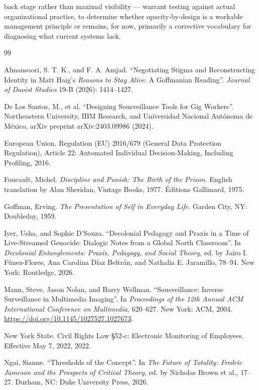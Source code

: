 \documentclass[12pt]{article}
\begin{document}
back stage rather than maximal visibility --- warrant testing against actual organizational practice, to determine whether opacity-by-design is a workable management principle or remains, for now, primarily a corrective vocabulary for diagnosing what current systems lack.

\newpage
\begin{thebibliography}{99}
\setlength{\itemsep}{0.6em}

 Almansoori, S. T. K., and F. A. Amjad. ``Negotiating Stigma and Reconstructing Identity in Matt Haig's \emph{Reasons to Stay Alive}: A Goffmanian Reading''. \emph{Journal of Daoist Studies} 19-B (2026): 1414--1427.

 De Los Santos, M., et al. ``Designing Sousveillance Tools for Gig Workers''. Northeastern University, IBM Research, and Universidad Nacional Aut\'onoma de M\'exico, arXiv preprint arXiv:2403.09986 (2024).

 European Union. Regulation (EU) 2016/679 (General Data Protection Regulation), Article 22: Automated Individual Decision-Making, Including Profiling, 2016.

 Foucault, Michel. \emph{Discipline and Punish: The Birth of the Prison}. English translation by Alan Sheridan, Vintage Books, 1977. \'Editions Gallimard, 1975.

 Goffman, Erving. \emph{The Presentation of Self in Everyday Life}. Garden City, NY: Doubleday, 1959.

 Iyer, Usha, and Sophie D'Souza. ``Decolonial Pedagogy and Praxis in a Time of Live-Streamed Genocide: Dialogic Notes from a Global North Classroom''. In \emph{Decolonial Entanglements: Praxis, Pedagogy, and Social Theory}, ed. by Jairo I. F\'unez-Flores, Ana Carolina D\'iaz Beltr\'an, and Nathalia E. Jaramillo, 78--94. New York: Routledge, 2026.

 Mann, Steve, Jason Nolan, and Barry Wellman. ``Sousveillance: Inverse Surveillance in Multimedia Imaging''. In \emph{Proceedings of the 12th Annual ACM International Conference on Multimedia}, 620--627. New York: ACM, 2004. \url{https://doi.org/10.1145/1027527.1027673}.

 New York State. Civil Rights Law \S 52-c: Electronic Monitoring of Employees. Effective May 7, 2022, 2022.

 Ngai, Sianne. ``Thresholds of the Concept''. In \emph{The Future of Totality: Fredric Jameson and the Prospects of Critical Theory}, ed. by Nicholas Brown et al., 17--27. Durham, NC: Duke University Press, 2026.


\end{thebibliography}
\end{document}
